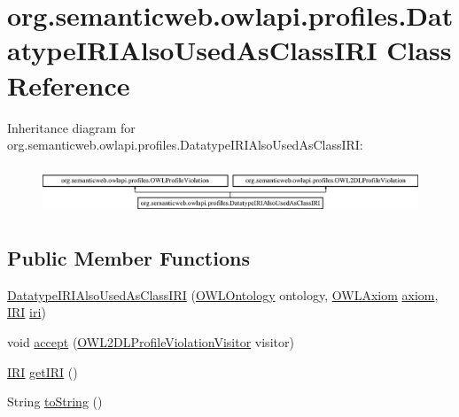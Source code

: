 \hypertarget{classorg_1_1semanticweb_1_1owlapi_1_1profiles_1_1_datatype_i_r_i_also_used_as_class_i_r_i}{\section{org.\-semanticweb.\-owlapi.\-profiles.\-Datatype\-I\-R\-I\-Also\-Used\-As\-Class\-I\-R\-I Class Reference}
\label{classorg_1_1semanticweb_1_1owlapi_1_1profiles_1_1_datatype_i_r_i_also_used_as_class_i_r_i}
}
Inheritance diagram for org.\-semanticweb.\-owlapi.\-profiles.\-Datatype\-I\-R\-I\-Also\-Used\-As\-Class\-I\-R\-I\-:\begin{figure}[H]
\begin{center}
\leavevmode
\includegraphics[height=1.465969cm]{classorg_1_1semanticweb_1_1owlapi_1_1profiles_1_1_datatype_i_r_i_also_used_as_class_i_r_i}
\end{center}
\end{figure}
\subsection*{Public Member Functions}
\begin{DoxyCompactItemize}
\item 
\hyperlink{classorg_1_1semanticweb_1_1owlapi_1_1profiles_1_1_datatype_i_r_i_also_used_as_class_i_r_i_a43e0b37554ecb1e7bf547b09a89c12db}{Datatype\-I\-R\-I\-Also\-Used\-As\-Class\-I\-R\-I} (\hyperlink{interfaceorg_1_1semanticweb_1_1owlapi_1_1model_1_1_o_w_l_ontology}{O\-W\-L\-Ontology} ontology, \hyperlink{interfaceorg_1_1semanticweb_1_1owlapi_1_1model_1_1_o_w_l_axiom}{O\-W\-L\-Axiom} \hyperlink{classorg_1_1semanticweb_1_1owlapi_1_1profiles_1_1_o_w_l_profile_violation_aa7c8e8910ed3966f64a2c003fb516214}{axiom}, \hyperlink{classorg_1_1semanticweb_1_1owlapi_1_1model_1_1_i_r_i}{I\-R\-I} \hyperlink{classorg_1_1semanticweb_1_1owlapi_1_1profiles_1_1_datatype_i_r_i_also_used_as_class_i_r_i_a7a7060004d85e838a78a4ae0c5ec8e17}{iri})
\item 
void \hyperlink{classorg_1_1semanticweb_1_1owlapi_1_1profiles_1_1_datatype_i_r_i_also_used_as_class_i_r_i_ad582dd74d82bd2fe972b08a6ba00a81b}{accept} (\hyperlink{interfaceorg_1_1semanticweb_1_1owlapi_1_1profiles_1_1_o_w_l2_d_l_profile_violation_visitor}{O\-W\-L2\-D\-L\-Profile\-Violation\-Visitor} visitor)
\item 
\hyperlink{classorg_1_1semanticweb_1_1owlapi_1_1model_1_1_i_r_i}{I\-R\-I} \hyperlink{classorg_1_1semanticweb_1_1owlapi_1_1profiles_1_1_datatype_i_r_i_also_used_as_class_i_r_i_a45aff711903fff4ea6a4f7584a74e5eb}{get\-I\-R\-I} ()
\item 
String \hyperlink{classorg_1_1semanticweb_1_1owlapi_1_1profiles_1_1_datatype_i_r_i_also_used_as_class_i_r_i_abaadc07f19334aa8413eed0a1f01db11}{to\-String} ()
\end{DoxyCompactItemize}

